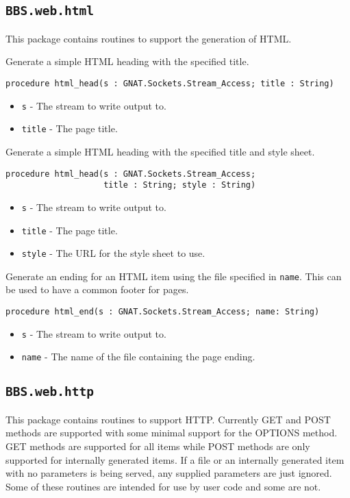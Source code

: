 \documentclass[10pt, openany]{book}
\newcommand{\package}[1]{\texttt{#1}}
\newcommand{\keyword}[1]{\texttt{#1}}
\begin{document}
\subsection{\package{BBS.web.html}}
This package contains routines to support the generation of HTML.

Generate a simple HTML heading with the specified title.
\begin{lstlisting}
procedure html_head(s : GNAT.Sockets.Stream_Access; title : String)
\end{lstlisting}
\begin{itemize}
  \item \keyword{s} - The stream to write output to.
  \item \keyword{title} - The page title.
\end{itemize}
Generate a simple HTML heading with the specified title and style sheet.
\begin{lstlisting}
procedure html_head(s : GNAT.Sockets.Stream_Access;
                    title : String; style : String)
\end{lstlisting}
\begin{itemize}
  \item \keyword{s} - The stream to write output to.
  \item \keyword{title} - The page title.
  \item \keyword{style} - The URL for the style sheet to use.
\end{itemize}
Generate an ending for an HTML item using the file specified in \keyword{name}.  This can be used to have a common footer for pages.
\begin{lstlisting}
procedure html_end(s : GNAT.Sockets.Stream_Access; name: String)
\end{lstlisting}
\begin{itemize}
  \item \keyword{s} - The stream to write output to.
  \item \keyword{name} - The name of the file containing the page ending.
\end{itemize}

\subsection{\package{BBS.web.http}}
This package contains routines to support HTTP.  Currently GET and POST methods are supported with some minimal support for the OPTIONS method.  GET methods are supported for all items while POST methods are only supported for internally generated items.  If a file or an internally generated item with no parameters is being served, any supplied parameters are just ignored. Some of these routines are intended for use by user code and some are not.
\end{document}
